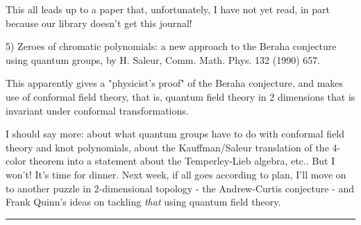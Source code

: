 This all leads up to a paper that, unfortunately, I have not yet read,
in part because our library doesn't get this journal!

5) Zeroes of chromatic polynomials: a new approach to the Beraha
conjecture using quantum groups, by H. Saleur, Comm. Math. Phys. 132
(1990) 657.  

This apparently gives a "physicist's proof" of the Beraha conjecture,
and makes use of conformal field theory, that is, quantum field theory
in 2 dimensions that is invariant under conformal transformations.

I should say more: about what quantum groups have to do with conformal
field theory and knot polynomials, about the Kauffman/Saleur translation
of the 4-color theorem into a statement about the Temperley-Lieb
algebra, etc..  But I won't!  It's time for dinner.  Next week, if all
goes according to plan, I'll move on to another puzzle in 2-dimensional
topology - the Andrew-Curtis conjecture - and Frank Quinn's ideas on
tackling \emph{that} using quantum field theory.
\par\noindent\rule{\textwidth}{0.4pt}

